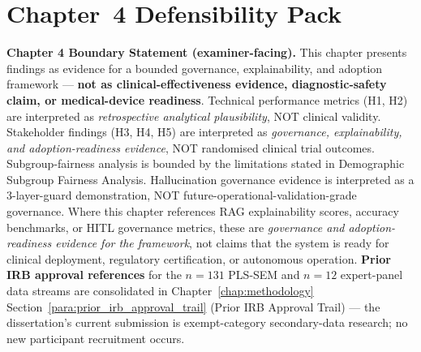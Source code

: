 \section*{Chapter~4 Defensibility Pack}
\label{sec:ch4_defensibility_pack}

\noindent\textbf{Chapter 4 Boundary Statement (examiner-facing).}
\label{para:ch4_boundary_statement}
This chapter presents findings as evidence for a bounded governance, explainability, and adoption framework --- \textbf{not as clinical-effectiveness evidence, diagnostic-safety claim, or medical-device readiness}. Technical performance metrics (H1, H2) are interpreted as \emph{retrospective analytical plausibility}, NOT clinical validity. Stakeholder findings (H3, H4, H5) are interpreted as \emph{governance, explainability, and adoption-readiness evidence}, NOT randomised clinical trial outcomes. Subgroup-fairness analysis is bounded by the limitations stated in Demographic Subgroup Fairness Analysis. Hallucination governance evidence is interpreted as a 3-layer-guard demonstration, NOT future-operational-validation-grade governance. Where this chapter references RAG explainability scores, accuracy benchmarks, or HITL governance metrics, these are \emph{governance and adoption-readiness evidence for the framework}, not claims that the system is ready for clinical deployment, regulatory certification, or autonomous operation. \textbf{Prior IRB approval references} for the $n{=}131$ PLS-SEM and $n{=}12$ expert-panel data streams are consolidated in Chapter~\ref{chap:methodology} Section~\ref{para:prior_irb_approval_trail} (Prior IRB Approval Trail) --- the dissertation's current submission is exempt-category secondary-data research; no new participant recruitment occurs.

